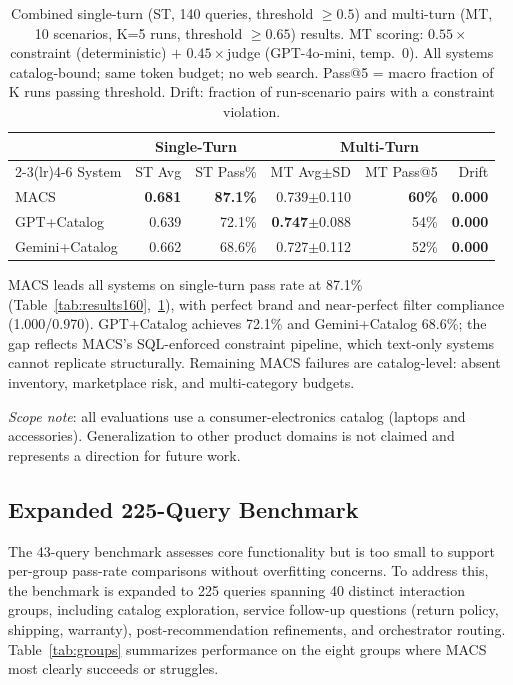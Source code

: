 \documentclass[sigconf,anonymous]{acmart}
\newcommand{\GPTCatalog}{GPT\allowbreak{}+\allowbreak{}Catalog}
\newcommand{\GeminiCatalog}{Gemini\allowbreak{}+\allowbreak{}Catalog}
\begin{document}
\begin{table}[t]
  \caption{Combined single-turn (ST, 140 queries, threshold $\geq 0.5$) and
  multi-turn (MT, 10 scenarios, K=5 runs, threshold $\geq 0.65$) results.
  MT scoring: $0.55\times$constraint (deterministic) $+$ $0.45\times$judge
  (GPT-4o-mini, temp.~0). All systems catalog-bound; same token budget; no web
  search. Pass@5 = macro fraction of K runs passing threshold.
  Drift: fraction of run-scenario pairs with a constraint violation.}
  \label{tab:combined}
  \footnotesize\setlength{\tabcolsep}{4pt}%
  \begin{tabular}{@{}lrrrrr@{}}
    \toprule
    & \multicolumn{2}{c}{Single-Turn} & \multicolumn{3}{c}{Multi-Turn} \\
    \cmidrule(lr){2-3}\cmidrule(lr){4-6}
    System & ST Avg & ST Pass\% & MT Avg$\pm$SD & MT Pass@5 & Drift \\
    \midrule
    MACS             & \textbf{0.681} & \textbf{87.1\%} & 0.739$\pm$0.110 & \textbf{60\%} & \textbf{0.000} \\
    \GPTCatalog{}    & 0.639          & 72.1\%          & \textbf{0.747}$\pm$0.088 & 54\%          & \textbf{0.000} \\
    \GeminiCatalog{} & 0.662          & 68.6\%          & 0.727$\pm$0.112 & 52\%          & \textbf{0.000} \\
    \bottomrule
  \end{tabular}
\end{table}

MACS leads all systems on single-turn pass rate at 87.1\%
(Table~\ref{tab:results160},~\ref{tab:combined}), with perfect brand and
near-perfect filter compliance (1.000/0.970). \GPTCatalog{} achieves 72.1\% and
\GeminiCatalog{} 68.6\%; the gap reflects MACS's SQL-enforced constraint pipeline,
which text-only systems cannot replicate structurally.
Remaining MACS failures are catalog-level: absent inventory, marketplace risk,
and multi-category budgets.

\emph{Scope note}: all evaluations use a consumer-electronics catalog
(laptops and accessories). Generalization to other product domains is not
claimed and represents a direction for future work.

\subsection{Expanded 225-Query Benchmark}
\label{sec:expanded}

The 43-query benchmark assesses core functionality but is too small to support
per-group pass-rate comparisons without overfitting concerns.
To address this, the benchmark is expanded to 225 queries spanning 40 distinct
interaction groups, including catalog exploration, service follow-up questions
(return policy, shipping, warranty), post-recommendation refinements, and
orchestrator routing. Table~\ref{tab:groups} summarizes performance on the
eight groups where MACS most clearly succeeds or struggles.
\end{document}
